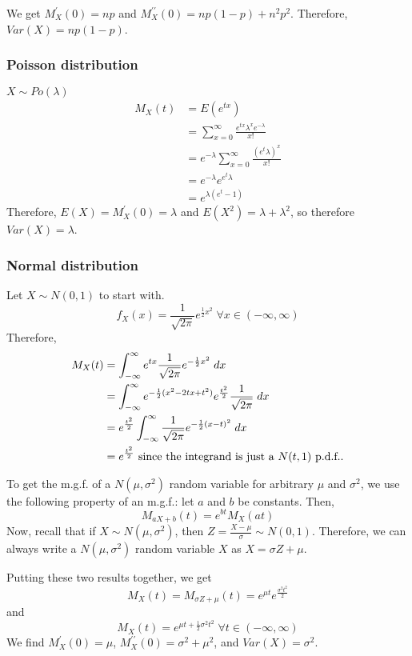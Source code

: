\documentclass[12pt]{article}
\begin{document}
We get $M_X^{\prime} (0) = np$ and $M_X^{\prime \prime} (0) = np(1-p) + n^2 p^2$. Therefore, $Var(X) = np(1-p)$.

\subsubsection{Poisson distribution}
$X \sim Po(\lambda)$
\begin{align*}
    M_X (t) &= E(e^{tx}) \\
        &= \sum_{x=0}^{\infty} \frac{e^{tx} \lambda^x e^{-\lambda}}{x!} \\
        &= e^{-\lambda} \sum_{x=0}^{\infty} \frac{ {(e^{t}\lambda)}^x}{x!} \\
        &= e^{-\lambda} e^{e^t \lambda} \\
        &= e^{\lambda (e^t - 1)}
\end{align*}
Therefore, $E(X) = M_X^{\prime} (0) = \lambda$ and $E(X^2) = \lambda + \lambda^2$, so therefore $Var(X) = \lambda$.

\subsubsection{Normal distribution}
Let $X \sim N(0,1)$ to start with. 
\[
    f_X (x) = \frac{1}{\sqrt{2 \pi}} e^{\frac{1}{2} x^2} \; \forall x \in (-\infty, \infty)
\]
Therefore,
\begin{align*}
    M_X (t) &= \int_{-\infty}^{\infty} e^{tx} \frac{1}{\sqrt{2 \pi}} e^{-\frac{1}{2} x^2} \; dx \\
        &= \int_{-\infty}^{\infty} e^{-\frac{1}{2} (x^2 - 2tx + t^2)} e^{\frac{t^2}{2}} \frac{1}{\sqrt{2\pi}} \; dx \\
        &= e^{\frac{t^2}{2}} \int_{-\infty}^{\infty} \frac{1}{\sqrt{2\pi}} e^{-\frac{1}{2} (x-t)^2} \; dx \\
        &= e^{\frac{t^2}{2}} \textnormal{ since the integrand is just a $N(t,1)$ p.d.f..}
\end{align*}

To get the m.g.f. of a $N(\mu, \sigma^2)$ random variable for arbitrary $\mu$ and $\sigma^2$, we use the following property of an m.g.f.: let $a$ and $b$ be constants. Then,
\[
    M_{aX + b} (t) = e^{bt} M_X (at)
\]
Now, recall that if $X \sim N(\mu, \sigma^2)$, then $Z = \frac{X-\mu}{\sigma} \sim N(0,1)$. Therefore, we can always write a $N(\mu, \sigma^2)$ random variable $X$ as $X = \sigma Z + \mu$.

Putting these two results together, we get
\[
    M_X (t) = M_{\sigma Z + \mu} (t) = e^{\mu t} e^{\frac{\sigma^2 t^2}{2}}
\]
and
\[
    M_X (t) = e^{\mu t + \frac{1}{2} \sigma^2 t^2} \; \forall t \in (-\infty, \infty)
\]
We find $M_X^{\prime} (0) = \mu$, $M_X^{\prime \prime} (0) = \sigma^2 + \mu^2$, and $Var(X) = \sigma^2$.
\end{document}
